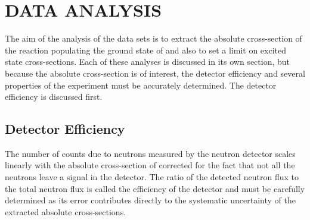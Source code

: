 %
%
%
%
%
%
%
%

%
%

\chapter{DATA ANALYSIS}
\label{chap:dataAnalysis}

The aim of the analysis of the \reaction data sets is to extract the absolute cross-section of the reaction populating the ground state of \SeProducts and also to set a limit on excited \zp state cross-sections.  Each of these analyses is discussed in its own section, but because the absolute cross-section is of interest, the detector efficiency and several properties of the experiment must be accurately determined.  The detector efficiency is discussed first.

\section{Detector Efficiency}

The number of counts due to neutrons measured by the neutron detector scales linearly with the absolute cross-section of \reaction corrected for the fact that not all the neutrons leave a signal in the detector.  The ratio of the detected neutron flux to the total neutron flux is called the efficiency of the detector and must be carefully determined as its error contributes directly to the systematic uncertainty of the extracted absolute cross-sections.

